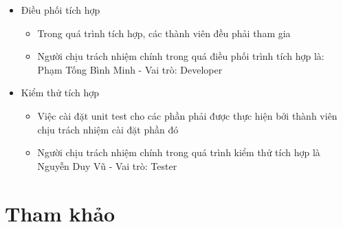 \documentclass[a4paper, 12pt]{article}
\begin{document}
\begin{itemize}
	\item Điều phối tích hợp
	\begin{itemize}
		\item Trong quá trình tích hợp, các thành viên đều phải tham gia
		\item Người chịu trách nhiệm chính trong quá điều phối trình tích hợp là: Phạm Tống Bình Minh - Vai trò: Developer
	\end{itemize}

	\item Kiểm thử tích hợp
	\begin{itemize}
		\item Việc cài đặt unit test cho các phần phải được thực hiện bởi thành viên chịu trách nhiệm cài đặt phần đó
		\item Người chịu trách nhiệm chính trong quá trình kiểm thử tích hợp là Nguyễn Duy Vũ - Vai trò: Tester
	\end{itemize}
\end{itemize}

\clearpage

\section{Tham khảo}
\clearpage
	
\end{document}
